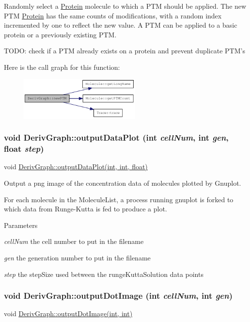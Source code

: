 Randomly select a \hyperlink{classProtein}{Protein} molecule to which a PTM should be applied. The new PTM \hyperlink{classProtein}{Protein} has the same counts of modifications, with a random index incremented by one to reflect the new value. A PTM can be applied to a basic protein or a previously existing PTM.

TODO: check if a PTM already exists on a protein and prevent duplicate PTM's 

Here is the call graph for this function:\nopagebreak
\begin{figure}[H]
\begin{center}
\leavevmode
\includegraphics[width=173pt]{classDerivGraph_a83937a5c3ed427ebaad2bf23260c0352_cgraph}
\end{center}
\end{figure}
\hypertarget{classDerivGraph_ae435e564c1fa8370453c952b1ea5e9ab}{
\subsubsection[{outputDataPlot}]{\setlength{\rightskip}{0pt plus 5cm}void DerivGraph::outputDataPlot (int {\em cellNum}, \/  int {\em gen}, \/  float {\em step})}}
\label{classDerivGraph_ae435e564c1fa8370453c952b1ea5e9ab}
void \hyperlink{classDerivGraph_ae435e564c1fa8370453c952b1ea5e9ab}{DerivGraph::outputDataPlot(int, int, float)}

Output a png image of the concentration data of molecules plotted by Gnuplot.

For each molecule in the MoleculeList, a process running gnuplot is forked to which data from Runge-\/Kutta is fed to produce a plot.


\begin{DoxyParams}{Parameters}
\item[{\em cellNum}]the cell number to put in the filename \item[{\em gen}]the generation number to put in the filename \item[{\em step}]the stepSize used between the rungeKuttaSolution data points \end{DoxyParams}
\hypertarget{classDerivGraph_a2e2ed79e21c6896a859cc7800d950809}{
\subsubsection[{outputDotImage}]{\setlength{\rightskip}{0pt plus 5cm}void DerivGraph::outputDotImage (int {\em cellNum}, \/  int {\em gen})}}
\label{classDerivGraph_a2e2ed79e21c6896a859cc7800d950809}
void \hyperlink{classDerivGraph_a2e2ed79e21c6896a859cc7800d950809}{DerivGraph::outputDotImage(int, int)}


